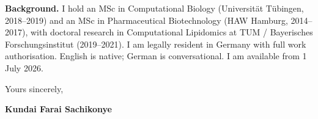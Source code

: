 \documentclass[12pt,a4paper]{article}
\begin{document}
\textbf{Background.}
I hold an MSc in Computational Biology (Universität Tübingen, 2018--2019)
and an MSc in Pharmaceutical Biotechnology (HAW Hamburg, 2014--2017),
with doctoral research in Computational Lipidomics at TUM / Bayerisches
Forschungsinstitut (2019--2021).
I am legally resident in Germany with full work authorisation.
English is native; German is conversational.
I am available from 1 July 2026.

\vspace{1.5em}
Yours sincerely,

\vspace{2.5em}
\textbf{Kundai Farai Sachikonye}
\end{document}
